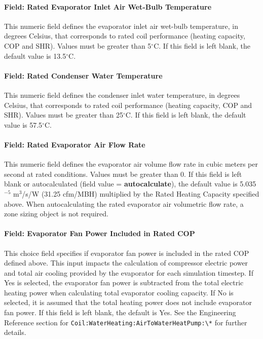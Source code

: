 \paragraph{Field: Rated Evaporator Inlet Air Wet-Bulb Temperature}\label{field-rated-evaporator-inlet-air-wet-bulb-temperature-1}

This numeric field defines the evaporator inlet air wet-bulb temperature, in degrees Celsius, that corresponds to rated coil performance (heating capacity, COP and SHR). Values must be greater than 5$^\circ$C. If this field is left blank, the default value is 13.5$^\circ$C.

\paragraph{Field: Rated Condenser Water Temperature}\label{field-rated-condenser-water-temperature}

This numeric field defines the condenser inlet water temperature, in degrees Celsius, that corresponds to rated coil performance (heating capacity, COP and SHR). Values must be greater than 25$^\circ$C. If this field is left blank, the default value is 57.5$^\circ$C.

\paragraph{Field: Rated Evaporator Air Flow Rate}\label{field-rated-evaporator-air-flow-rate-1}

This numeric field defines the evaporator air volume flow rate in cubic meters per second at rated conditions. Values must be greater than 0. If this field is left blank or autocalculated (field value = \textbf{autocalculate}), the default value is 5.035$^{-5}$ m$^{3}$/s/W (31.25 cfm/MBH) multiplied by the Rated Heating Capacity specified above. When autocalculating the rated evaporator air volumetric flow rate, a zone sizing object is not required.

\paragraph{Field: Evaporator Fan Power Included in Rated COP}\label{field-evaporator-fan-power-included-in-rated-cop-1}

This choice field specifies if evaporator fan power is included in the rated COP defined above. This input impacts the calculation of compressor electric power and total air cooling provided by the evaporator for each simulation timestep. If Yes is selected, the evaporator fan power is subtracted from the total electric heating power when calculating total evaporator cooling capacity. If No is selected, it is assumed that the total heating power does not include evaporator fan power. If this field is left blank, the default is Yes. See the Engineering Reference section for \lstinline!Coil:WaterHeating:AirToWaterHeatPump:\*! for further details.

